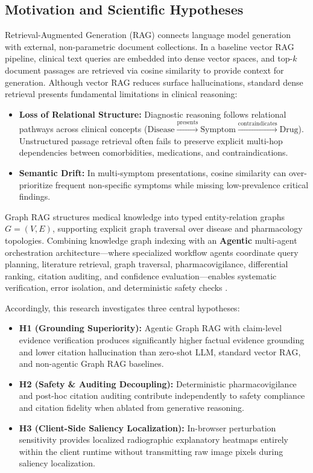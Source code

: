 \documentclass[journal,10pt,twocolumn]{IEEEtran}
\begin{document}
\subsection{Motivation and Scientific Hypotheses}
Retrieval-Augmented Generation (RAG) \cite{lewis2020retrieval} connects language model generation with external, non-parametric document collections. In a baseline vector RAG pipeline, clinical text queries are embedded into dense vector spaces, and top-$k$ document passages are retrieved via cosine similarity to provide context for generation. Although vector RAG reduces surface hallucinations, standard dense retrieval presents fundamental limitations in clinical reasoning:
\begin{itemize}
    \item \textbf{Loss of Relational Structure:} Diagnostic reasoning follows relational pathways across clinical concepts ($\text{Disease} \xrightarrow{\text{presents}} \text{Symptom} \xrightarrow{\text{contraindicates}} \text{Drug}$). Unstructured passage retrieval often fails to preserve explicit multi-hop dependencies between comorbidities, medications, and contraindications.
    \item \textbf{Semantic Drift:} In multi-symptom presentations, cosine similarity can over-prioritize frequent non-specific symptoms while missing low-prevalence critical findings.
\end{itemize}

Graph RAG \cite{edge2024from, wu2025medical} structures medical knowledge into typed entity-relation graphs $G=(V,E)$, supporting explicit graph traversal over disease and pharmacology topologies. Combining knowledge graph indexing with an \textbf{Agentic} multi-agent orchestration architecture---where specialized workflow agents coordinate query planning, literature retrieval, graph traversal, pharmacovigilance, differential ranking, citation auditing, and confidence evaluation---enables systematic verification, error isolation, and deterministic safety checks \cite{du2023improving, chen2025enhancing, rezaei2024agentic}.

Accordingly, this research investigates three central hypotheses:
\begin{itemize}
    \item \textbf{H1 (Grounding Superiority):} Agentic Graph RAG with claim-level evidence verification produces significantly higher factual evidence grounding and lower citation hallucination than zero-shot LLM, standard vector RAG, and non-agentic Graph RAG baselines.
    \item \textbf{H2 (Safety \& Auditing Decoupling):} Deterministic pharmacovigilance and post-hoc citation auditing contribute independently to safety compliance and citation fidelity when ablated from generative reasoning.
    \item \textbf{H3 (Client-Side Saliency Localization):} In-browser perturbation sensitivity provides localized radiographic explanatory heatmaps entirely within the client runtime without transmitting raw image pixels during saliency localization.
\end{itemize}
\end{document}
